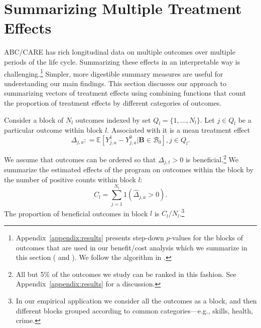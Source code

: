 


\usepackage[stable]{footmisc}

\newcommand*\leftright[2]{%
  \leavevmode
  \rlap{#1}%
  \hspace{0.5\linewidth}%
  #2}

\newcommand{\orth}{\ensuremath{\perp\!\!\!\perp}}%
\newcommand{\indep}{\orth}%
\newcommand{\notorth}{\ensuremath{\perp\!\!\!\!\!\!\diagup\!\!\!\!\!\!\perp}}%
\newcommand{\notindep}{\notorth}







\doublespacing
\setcounter{section}{3}
\section{Summarizing Multiple Treatment Effects} \label{section:methodology}

ABC/CARE has rich longitudinal data on multiple outcomes over multiple periods of the life cycle. Summarizing these effects in an interpretable way is challenging.\footnote{Appendix~\ref{appendix:results} presents step-down $p$-values for the blocks of outcomes that are used in our benefit/cost analysis which we summarize in this section (\citealp{Lehman_Romano_2005_AnnStat} and \citealp{Romano_Shaikh_2006_AnnStat}). We follow the algorithm in \citet{Romano_Wolf_2016_pval_SaPL}.} Simpler, more digestible summary measures are useful for understanding our main findings. This section discusses our approach to summarizing vectors of treatment effects using combining functions that count the proportion of treatment effects by different categories of outcomes.

Consider a block of $N_l$ outcomes indexed by set $Q_l = \{1,\dots,N_l\}$. Let $j \in Q_l$ be a particular outcome within block $l$. Associated with it is a mean treatment effect
\begin{equation}
\Delta_{j,a} : = \mathbb{E} \left[ Y^1_{j,a} - Y^0_{j,a} | \bm{B} \in \mathcal{B}_0 \right], j \in Q_l.
\end{equation}

We assume that outcomes can be ordered so that $\Delta_{j,t} >0$ is beneficial.\footnote{All but 5\% of the outcomes we study can be ranked in this fashion. See Appendix~\ref{appendix:results} for a discussion.} We summarize the estimated effects of the program on outcomes within the block by the number of positive counts within block $l$:
\begin{equation}
C_l = \sum^{N_l}_{j=1} 1 (\hat{\Delta}_{j,a} >0).
\end{equation}
The proportion of beneficial outcomes in block $l$ is $C_l / N_l$.\footnote{In our empirical application we consider all the outcomes as a block, and then different blocks grouped according to common categories---e.g., skills, health, crime.}

